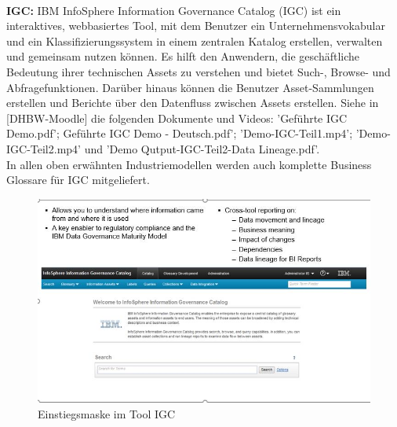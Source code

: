 \documentclass[12pt]{article}
\begin{document}
\\[4.2cm] 
%
\textbf{IGC:} IBM InfoSphere Information Governance Catalog (IGC) ist ein interaktives, webbasiertes Tool, mit dem Benutzer ein Unternehmensvokabular und ein Klassifizierungssystem in einem zentralen Katalog erstellen, verwalten und gemeinsam nutzen können. Es hilft den Anwendern, die geschäftliche Bedeutung ihrer technischen Assets zu verstehen und bietet Such-, Browse- und Abfragefunktionen. Darüber hinaus können die Benutzer Asset-Sammlungen erstellen und Berichte über den Datenfluss zwischen Assets erstellen. Siehe in [DHBW-Moodle] die folgenden Dokumente und Videos:
'Geführte IGC Demo.pdf'; Geführte IGC Demo - Deutsch.pdf'; 'Demo-IGC-Teil1.mp4'; 'Demo-IGC-Teil2.mp4' und 'Demo Qutput-IGC-Teil2-Data Lineage.pdf'. \\
In allen oben erwähnten Industriemodellen werden auch komplette Business Glossare für IGC mitgeliefert. \\[0.2cm] 
%
\begin{figure}[htp]
  \centering
  \hspace*{-0.3cm} 
  \includegraphics[width=1.1\textwidth]{IGC-Overview}
  \caption{Einstiegsmaske im Tool IGC}
  \label{fig:IGC-Overview}
\end{figure}
%
\end{document}

